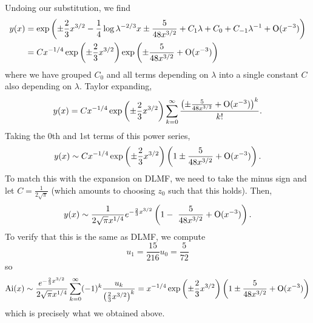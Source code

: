 \documentclass{article}
\begin{document}
Undoing our substitution, we find
\begin{align*}
y(x)&=\exp\left(\pm\frac{2}{3}x^{3/2}-\frac{1}{4}\log{\lambda^{-2/3}x}\pm\frac{5}{48x^{3/2}}+C_1\lambda+C_0+C_{-1}\lambda^{-1}+\operatorname{O}(x^{-3})\right)\\&=
Cx^{-1/4}\exp\left(\pm\frac{2}{3}x^{3/2}\right)\exp\left(\pm\frac{5}{48x^{3/2}}+\operatorname{O}(x^{-3})\right)
\end{align*}
where we have grouped $C_0$ and all terms depending on $\lambda$ into a single constant $C$ also depending on $\lambda$. Taylor expanding,
\begin{align*}
y(x)=Cx^{-1/4}\exp\left(\pm\frac{2}{3}x^{3/2}\right)\sum_{k=0}^\infty\frac{\left(\pm\frac{5}{48x^{3/2}}+\operatorname{O}(x^{-3})\right)^k}{k!}.
\end{align*}
Taking the 0th and 1st terms of this power series,
\[
y(x)\sim Cx^{-1/4}\exp\left(\pm\frac{2}{3}x^{3/2}\right)\left(1\pm \frac{5}{48x^{3/2}}+\operatorname{O}(x^{-3})\right).
\]
To match this with the expansion on DLMF, we need to take the minus sign and let $C=\frac{1}{2\sqrt{\pi}}$ (which amounts to choosing $z_0$ such that this holds). Then,
\[
y(x)\sim \frac{1}{2\sqrt{\pi}x^{1/4}}e^{-\frac{2}{3}x^{3/2}}\left(1-\ \frac{5}{48x^{3/2}}+\OO(x^{-3})\right).
\]
To verify that this is the same as DLMF, we compute
\[
u_1=\frac{15}{216}u_0=\frac{5}{72}
\]
so
\begin{align*}
\text{Ai}(x)\sim\frac{e^{-\frac{2}{3}x^{3/2}}}{2\sqrt{\pi}x^{1/4}}\sum_{k=0}^\infty(-1)^k\frac{u_k}{\left(\frac{2}{3}x^{3/2}\right)^k}=x^{-1/4}\exp\left(\pm\frac{2}{3}x^{3/2}\right)\left(1\pm \frac{5}{48x^{3/2}}+\operatorname{O}(x^{-3})\right)
\end{align*}
which is precisely what we obtained above.
\end{document}
